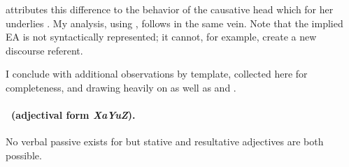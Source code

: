 \begin{exe}
\begin{xlist}
\begin{exe}
\begin{xlist}
\begin{exe}
\begin{exe}
\begin{xlist}
\begin{exe}
\begin{exe}
\begin{xlist}
\begin{exe}
\begin{xlist}
\begin{exe}
\begin{xlist}
\begin{exe}
\begin{xlist}
\begin{xlist}
\begin{exe}
\begin{xlist}
\begin{exe}
\begin{xlist}
\begin{exe}
\begin{exe}
\begin{exe}
\begin{xlist}
\begin{exe}
\begin{exe}
\begin{xlist}
\begin{exe}
\begin{xlist}
\begin{exe}
\begin{xlist}
\begin{exe}
\begin{xlist}
\begin{xlist}
\begin{exe}
\begin{xlist}
\begin{exe}
\begin{xlist}
\begin{exe}
\begin{xlist}
\begin{exe}
\begin{xlist}
\begin{exe}
\begin{exe}
\begin{exe}
\begin{exe}
\begin{exe}
\begin{xlist}
\begin{xlist}
\begin{exe}
\begin{xlist}
\begin{exe}
\begin{xlist}
\cite{doron14adj} attributes this difference to the behavior of the causative head  which for her underlies {\thif}. My analysis, using {\vd}, follows in the same vein. Note that the implied EA is not syntactically represented; it cannot, for example, create a new discourse referent.
 \begin{exe}
 \z 

I conclude with additional observations by template, collected here for completeness, and drawing heavily on \cite{doron00} as well as \cite{doron14adj} and \cite{meltzerasscher11}.

\paragraph*{\tkal~(adjectival form \emph{XaYuZ}).} No verbal passive exists for {\tkal} but stative and resultative adjectives are both possible.


\end{exe}
\end{xlist}
\end{exe}
\end{xlist}
\end{exe}
\end{xlist}
\end{xlist}
\end{exe}
\end{exe}
\end{exe}
\end{exe}
\end{exe}
\end{xlist}
\end{exe}
\end{xlist}
\end{exe}
\end{xlist}
\end{exe}
\end{xlist}
\end{exe}
\end{xlist}
\end{xlist}
\end{exe}
\end{xlist}
\end{exe}
\end{xlist}
\end{exe}
\end{xlist}
\end{exe}
\end{exe}
\end{xlist}
\end{exe}
\end{exe}
\end{exe}
\end{xlist}
\end{exe}
\end{xlist}
\end{exe}
\end{xlist}
\end{xlist}
\end{exe}
\end{xlist}
\end{exe}
\end{xlist}
\end{exe}
\end{xlist}
\end{exe}
\end{exe}
\end{xlist}
\end{exe}
\end{exe}
\end{xlist}
\end{exe}
\end{xlist}
\end{exe}
